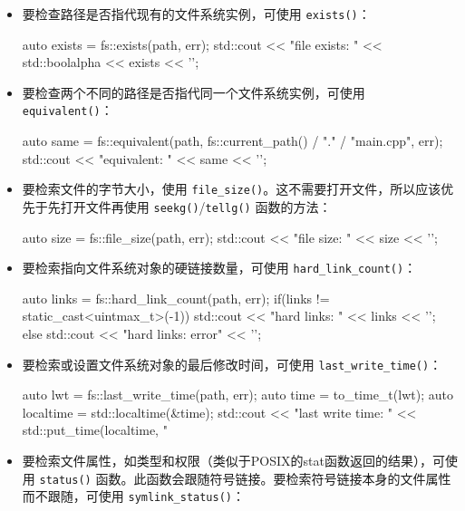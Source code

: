 \begin{itemize}
\item
要检查路径是否指代现有的文件系统实例，可使用 \verb|exists()|：

\begin{cpp}
auto exists = fs::exists(path, err);
std::cout << "file exists: " << std::boolalpha
          << exists << '\n';
\end{cpp}

\item
要检查两个不同的路径是否指代同一个文件系统实例，可使用 \verb|equivalent()|：

\begin{cpp}
auto same = fs::equivalent(path,
                fs::current_path() / "." / "main.cpp", err);
std::cout << "equivalent: " << same << '\n';
\end{cpp}

\item
要检索文件的字节大小，使用 \verb|file_size()|。这不需要打开文件，所以应该优先于先打开文件再使用 \verb|seekg()|/\verb|tellg()| 函数的方法：

\begin{cpp}
auto size = fs::file_size(path, err);
std::cout << "file size: " << size << '\n';
\end{cpp}

\item
要检索指向文件系统对象的硬链接数量，可使用 \verb|hard_link_count()|：

\begin{cpp}
auto links = fs::hard_link_count(path, err);
if(links != static_cast<uintmax_t>(-1))
    std::cout << "hard links: " << links << '\n';
else
    std::cout << "hard links: error" << '\n';
\end{cpp}

\item
要检索或设置文件系统对象的最后修改时间，可使用 \verb|last_write_time()|：

\begin{cpp}
auto lwt = fs::last_write_time(path, err);
auto time = to_time_t(lwt);
auto localtime = std::localtime(&time);
std::cout << "last write time: "
          << std::put_time(localtime, "%
\end{cpp}

\item
要检索文件属性，如类型和权限（类似于POSIX的stat函数返回的结果），可使用 \verb|status()| 函数。此函数会跟随符号链接。要检索符号链接本身的文件属性而不跟随，可使用 \verb|symlink_status()|：


\end{itemize}
